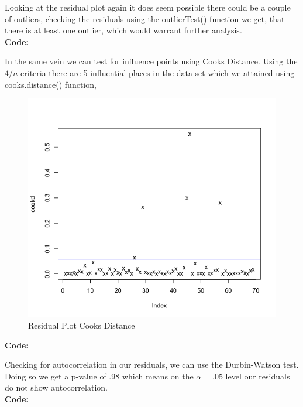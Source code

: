 \documentclass[12pt]{article}
\makeatletter
\theoremstyle{homework}
\newenvironment{exercise}[1]
{\def\@currentlabel{#1}\exercisecore}
{\endexercisecore}
\makeatother
\begin{document}
\begin{exercise}{1}
\begin{enumerate}
       Looking at the residual plot again it does seem possible there could be a couple of outliers, checking the residuals using the outlierTest() function we get, 
       that there is at least one outlier, which would warrant further analysis.\\
       \textbf{Code:}
       \begin{center}
       
       \end{center} 
       In the same vein we can test for influence points using Cooks Distance. Using the $4/n$ criteria there are 5 influential places in the data set
       which we attained using cooks.distance() function, 
       \begin{figure}[H]
        \begin{center}
        \caption{Residual Plot Cooks Distance}
        \includegraphics[width = \textwidth]{Rplot02.png}
        \end{center}
      \end{figure}
      \textbf{Code:}
      \begin{center}
      
      \end{center} 


      Checking for autocorrelation in our residuals, we can use the Durbin-Watson test. Doing so we get a p-value of .98
      which means on the $\alpha = .05$ level our residuals do not show autocorrelation. \\
      \textbf{Code:}
      \begin{center}
      
      \end{center} 


\end{enumerate}
\end{exercise}
\end{document}
